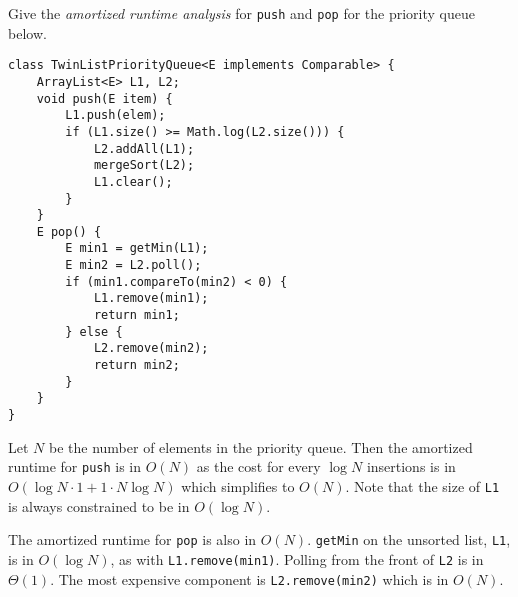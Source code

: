\begin{blocksection}
\question Give the \emph{amortized runtime analysis} for \lstinline$push$ and
\lstinline$pop$ for the priority queue below.

\begin{lstlisting}
class TwinListPriorityQueue<E implements Comparable> {
    ArrayList<E> L1, L2;
    void push(E item) {
        L1.push(elem);
        if (L1.size() >= Math.log(L2.size())) {
            L2.addAll(L1);
            mergeSort(L2);
            L1.clear();
        }
    }
    E pop() {
        E min1 = getMin(L1);
        E min2 = L2.poll();
        if (min1.compareTo(min2) < 0) {
            L1.remove(min1);
            return min1;
        } else {
            L2.remove(min2);
            return min2;
        }
    }
}
\end{lstlisting}

\begin{solution}
Let $N$ be the number of elements in the priority queue. Then the amortized
runtime for \lstinline$push$ is in $O(N)$ as the cost for every $\log N$
insertions is in $O(\log N \cdot 1 + 1 \cdot N \log N)$ which simplifies to
$O(N)$. Note that the size of \lstinline$L1$ is always constrained to be in
$O(\log N)$.

The amortized runtime for \lstinline$pop$ is also in $O(N)$. \lstinline$getMin$
on the unsorted list, \lstinline$L1$, is in $O(\log N)$, as with
\lstinline$L1.remove(min1)$. Polling from the front of \lstinline$L2$ is in
$\Theta(1)$. The most expensive component is \lstinline$L2.remove(min2)$ which
is in $O(N)$.
\end{solution}
\end{blocksection}
